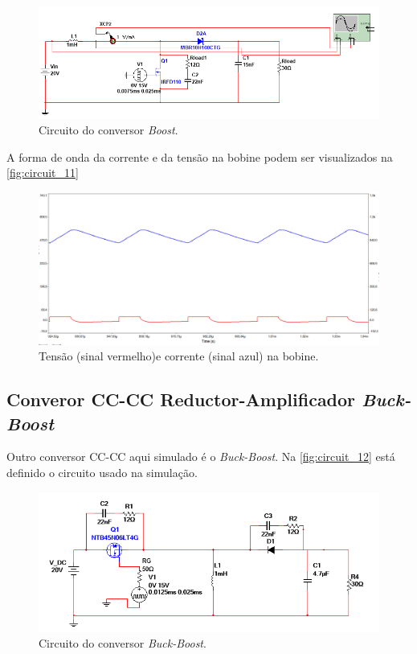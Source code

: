 \documentclass[a4paper,11pt]{article}
\numberwithin{equation}{section}
\begin{document}
\begin{figure}[h]
	\centering
	\includegraphics[keepaspectratio=true, scale=0.55]{img/circuito10}
	\caption{Circuito do conversor \textit{Boost}.}
	\label{fig:circuit_10}
	\vspace{-0.8em}
\end{figure}

\pagebreak
A forma de onda da corrente e da tensão na bobine podem ser visualizados na \autoref{fig:circuit_11}

\begin{figure}[h]
	\centering
	\includegraphics[keepaspectratio=true, scale=0.35]{img/circuito11}
	\caption{Tensão (sinal vermelho)e corrente (sinal azul) na bobine.}
	\label{fig:circuit_11}
	\vspace{-0.8em}
\end{figure}

\subsection{ Converor CC-CC Reductor-Amplificador \textit{Buck-Boost}}

Outro conversor CC-CC aqui simulado é o \textit{Buck-Boost}. Na \autoref{fig:circuit_12} está definido o circuito usado na simulação.

\begin{figure}[h]
	\centering
	\includegraphics[keepaspectratio=true, scale=0.55]{img/circuito12}
	\caption{Circuito do conversor \textit{Buck-Boost}.}
	\label{fig:circuit_12}
	\vspace{-0.8em}
\end{figure}
\end{document}
